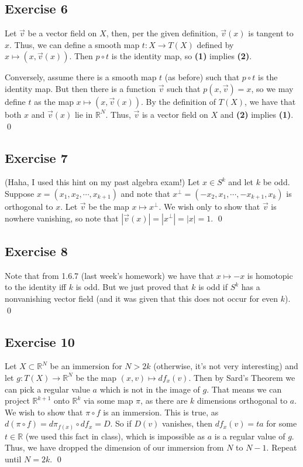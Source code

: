 \documentclass{article}
\newcommand{\R}{\mathbb{R}}
\begin{document}
  \subsection*{Exercise 6}
    Let $\vec{v}$ be a vector field on $X$, then, per the given definition,
    $\vec{v}(x)$ is tangent to $x$. Thus, we can define a smooth map $t\colon X
    \to T(X)$ defined by $x\mapsto(x,\vec{v}(x))$. Then $p\circ t$ is the
    identity map, so \textbf{(1)} implies \textbf{(2)}.

    Conversely, assume there is a smooth map $t$ (as before) such that $p\circ
    t$ is the identity map. But then there is a function $\vec{v}$ such that
    $p(x,\vec{v})=x$, so we may define $t$ as the map $x\mapsto(x,\vec{v}(x))$.
    By the definition of $T(X)$, we have that both $x$ and $\vec{v}(x)$ lie in
    $\R^N$. Thus, $\vec{v}$ is a vector field on $X$ and \textbf{(2)} implies
    \textbf{(1)}.
    \qed

  \subsection*{Exercise 7}
    (Haha, I used this hint on my past algebra exam!) Let $x\in S^k$ and let $k$
    be odd. Suppose $x=(x_1,x_2,\cdots,x_{k+1})$ and note that $x^\perp=(-x_2,
    x_1,\cdots,-x_{k+1},x_{k})$ is orthogonal to $x$. Let $\vec{v}$ be the map
    $x\mapsto x^\perp$. We wish only to show that $\vec{v}$ is nowhere
    vanishing, so note that $|\vec{v}(x)|=|x^\perp|=|x|=1$.
    \qed

  \subsection*{Exercise 8}
    Note that from 1.6.7 (last week's homework) we have that $x\mapsto-x$ is
    homotopic to the identity iff $k$ is odd. But we just proved that $k$ is odd
    if $S^k$ has a nonvanishing vector field (and it was given that this does
    not occur for even $k$).
    \qed

  \subsection*{Exercise 10}
    Let $X\subset\R^N$ be an immersion for $N>2k$ (otherwise, it's not very
    interesting) and let $g\colon T(X)\to\R^N$ be the map $(x,v)\mapsto
    df_x(v)$. Then by Sard's Theorem we can pick a regular value $a$ which is
    not in the image of $g$. That means we can project $\R^{k+1}$ onto $\R^k$
    via some map $\pi$, as there are $k$ dimensions orthogonal to $a$. We wish
    to show that $\pi\circ f$ is an immersion. This is true, as $d(\pi\circ f)=
    d\pi_{f(x)}\circ df_x=D$. So if $D(v)$ vanishes, then $df_x(v)=ta$ for some
    $t\in\R$ (we used this fact in class), which is impossible as $a$ is a
    regular value of $g$. Thus, we have dropped the dimension of our immersion
    from $N$ to $N-1$. Repeat until $N=2k$.
    \qed
\end{document}
